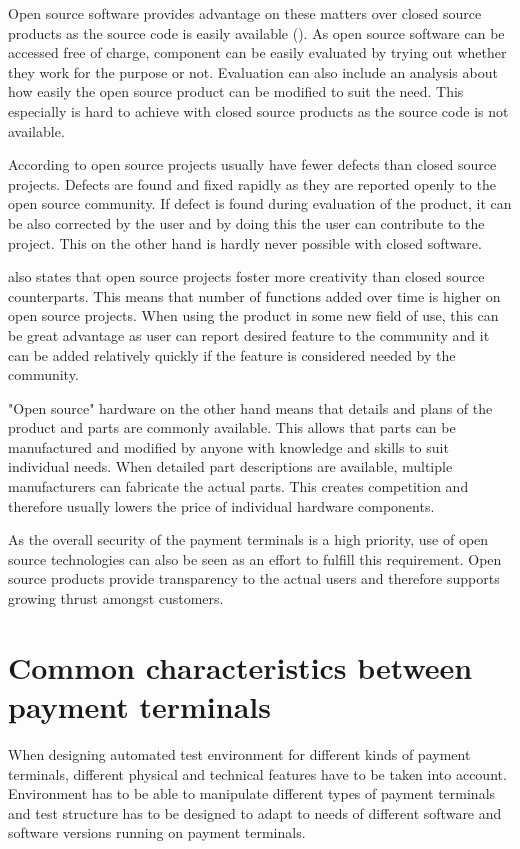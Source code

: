 Open source software provides advantage on these matters over closed source products as the source code is easily available (\emph{\cite{morgan2007benefits}}). As open source software can be accessed free of charge, component can be easily evaluated by trying out whether they work for the purpose or not. Evaluation can also include an analysis about how easily the open source product can be modified to suit the need. This especially is hard to achieve with closed source products as the source code is not available.

According to \emph{\cite{paulson2004empirical}} open source projects usually have fewer defects than closed source projects. Defects are found and fixed rapidly as they are reported openly to the open source community. If defect is found during evaluation of the product, it can be also corrected by the user and by doing this the user can contribute to the project. This on the other hand is hardly never possible with closed software.

\emph{\cite{paulson2004empirical}} also states that open source projects foster more creativity than closed source counterparts. This means that number of functions added over time is higher on open source projects. When using the product in some new field of use, this can be great advantage as user can report desired feature to the community and it can be added relatively quickly if the feature is considered needed by the community.

"Open source" hardware on the other hand means that details and plans of the product and parts are commonly available. This allows that parts can be manufactured and modified by anyone with knowledge and skills to suit individual needs. When detailed part descriptions are available, multiple manufacturers can fabricate the actual parts. This creates competition and therefore usually lowers the price of individual hardware components.

As the overall security of the payment terminals is a high priority, use of open source technologies can also be seen as an effort to fulfill this requirement. Open source products provide transparency to the actual users and therefore supports growing thrust amongst customers.

\section{Common characteristics between payment terminals}

When designing automated test environment for different kinds of payment terminals, different physical and technical features have to be taken into account. Environment has to be able to manipulate different types of payment terminals and test structure has to be designed to adapt to needs of different software and software versions running on payment terminals.

